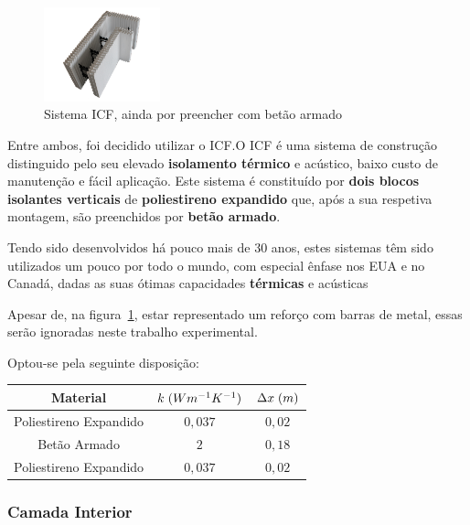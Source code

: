 \documentclass[12pt, a4paper]{article}
\begin{document}
\begin{figure}[htpb]
	\centering
	\includegraphics[width=0.3\textwidth]{icf-exemplo.png}

	\caption{Sistema ICF, ainda por preencher com betão armado}\label{fig:icf1}
\end{figure}

Entre ambos, foi decidido utilizar o ICF.\@ O ICF é uma sistema de construção distinguido pelo seu elevado
\textbf{isolamento térmico} e acústico, baixo custo de manutenção e fácil aplicação. Este sistema é constituído por
\textbf{dois blocos isolantes verticais} de \textbf{poliestireno expandido} que, após a sua respetiva montagem,
são preenchidos por \textbf{betão armado}.


Tendo sido desenvolvidos há pouco mais de 30 anos, estes sistemas têm sido utilizados um pouco por todo o mundo,
com especial ênfase nos EUA e no Canadá, dadas as suas ótimas capacidades \textbf{térmicas} e acústicas

Apesar de, na figura~\ref{fig:icf1}, estar representado um reforço com barras de metal, essas serão
ignoradas neste trabalho experimental.

Optou-se pela seguinte disposição:

\begin{center}
	\begin{tabular}{||c c c||}
		\hline
		Material               & $k \hspace{1mm} (Wm^{-1}K^{-1})$ & $\Delta x \hspace{1mm} (m)$ \\ [0.5ex]
		\hline\hline
		Poliestireno Expandido & $0,037$                          & $0,02$                      \\
		\hline
		Betão Armado           & $2$                              & $0,18$                      \\
		\hline
		Poliestireno Expandido & $0,037$                          & $0,02$                      \\
		\hline
	\end{tabular}
\end{center}

\subsubsection{Camada Interior}\label{pext_ci}
\end{document}
